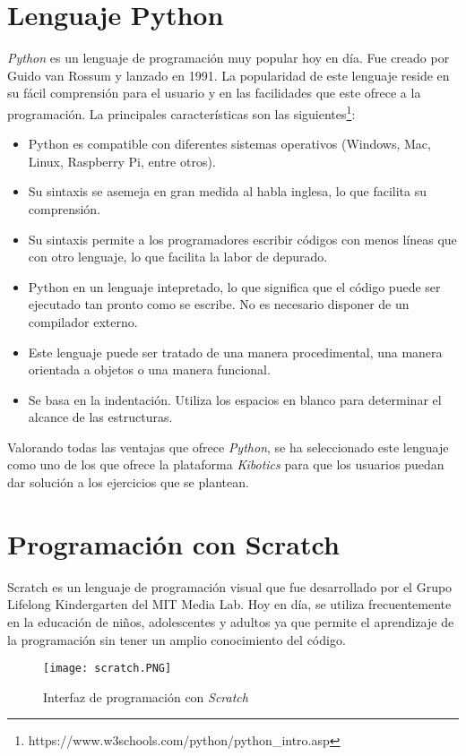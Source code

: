 \section{Lenguaje Python}
\textit{Python} es un lenguaje de programación muy popular hoy en día. Fue creado por Guido van Rossum y lanzado en 1991. La popularidad de este lenguaje reside en su fácil comprensión para el usuario y en las facilidades que este ofrece a la programación. La principales características son las siguientes\footnote{https://www.w3schools.com/python/python_intro.asp}:
\begin{itemize}
    \item Python es compatible con diferentes sistemas operativos (Windows, Mac, Linux, Raspberry Pi, entre otros).
    \item Su sintaxis se asemeja en gran medida al habla inglesa, lo que facilita su comprensión.
    \item Su sintaxis permite a los programadores escribir códigos con menos líneas que con otro lenguaje, lo que facilita la labor de depurado.
    \item Python en un lenguaje intepretado, lo que significa que el código puede ser ejecutado tan pronto como se escribe. No es necesario disponer de un compilador externo.
    \item Este lenguaje puede ser tratado de una manera procedimental, una manera orientada a objetos o una manera funcional.
    \item Se basa en la indentación. Utiliza los espacios en blanco para determinar el alcance de las estructuras.
\end{itemize}

Valorando todas las ventajas que ofrece \textit{Python}, se ha seleccionado este lenguaje como uno de los que ofrece la plataforma \textit{Kibotics} para que los usuarios puedan dar solución a los ejercicios que se plantean.

\section{Programación con Scratch}
Scratch es un lenguaje de programación visual que fue desarrollado por el Grupo Lifelong Kindergarten del MIT Media Lab. Hoy en día, se utiliza frecuentemente en la educación de niños, adolescentes y adultos ya que permite el aprendizaje de la programación sin tener un amplio conocimiento del código. \newline 

\begin{figure}[h!]
    \centering
    \texttt{[image: scratch.PNG]}
    \caption{Interfaz de programación con \textit{Scratch}}
    \label{fig:scratch}
\end{figure}

